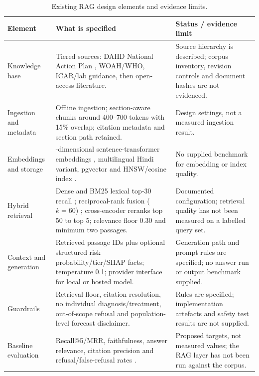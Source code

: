 \documentclass[10pt,openany]{report}
\begin{document}
\begin{table}[htbp]
\centering
\caption{Existing RAG design elements and evidence limits.}
\label{tab:rag-existing}
\small
\begin{tabular}{@{}>{\raggedright\arraybackslash}p{2.6cm}
                >{\raggedright\arraybackslash}p{6.2cm}
                >{\raggedright\arraybackslash}p{5.2cm}@{}}
\toprule
\textbf{Element} & \textbf{What is specified} & \textbf{Status / evidence limit} \\
\midrule
Knowledge base &
Tiered sources: DAHD National Action Plan \cite{dahd2025}, WOAH/WHO, ICAR/lab guidance, then open-access literature. &
Source hierarchy is described; corpus inventory, revision controls and document hashes are not evidenced. \\
Ingestion and metadata &
Offline ingestion; section-aware chunks around 400--700 tokens with 15\% overlap; citation metadata and section path retained. &
Design settings, not a measured ingestion result. \\
Embeddings and storage &
384-dimensional sentence-transformer embeddings \cite{reimers2019}, multilingual Hindi variant, pgvector and HNSW/cosine index \cite{malkov2020}. &
No supplied benchmark for embedding or index quality. \\
Hybrid retrieval &
Dense and BM25 lexical top-30 recall \cite{robertson2009}; reciprocal-rank fusion ($k=60$) \cite{cormack2009}; cross-encoder reranks top 50 to top 5; relevance floor 0.30 and minimum two passages. &
Documented configuration; retrieval quality has not been measured on a labelled query set. \\
Context and generation &
Retrieved passage IDs plus optional structured risk probability/tier/SHAP facts; temperature 0.1; provider interface for local or hosted model. &
Generation path and prompt rules are specified; no answer run or output benchmark supplied. \\
Guardrails &
Retrieval floor, citation resolution, no individual diagnosis/treatment, out-of-scope refusal and population-level forecast disclaimer. &
Rules are specified; implementation artefacts and safety test results are not supplied. \\
Baseline evaluation &
Recall@5/MRR, faithfulness, answer relevance, citation precision and refusal/false-refusal rates \cite{es2024,saadfalcon2024,ru2024,gao2023}. &
Proposed targets, not measured values; the RAG layer has not been run against the corpus. \\
\bottomrule
\end{tabular}
\end{table}
\end{document}
